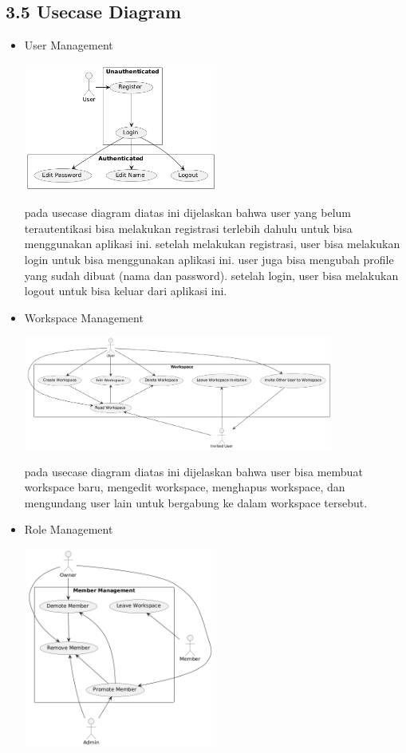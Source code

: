 \subsection*{3.5 Usecase Diagram}
\begin{itemize}
  \item User Management
  \begin{center}
    \includegraphics[width=0.5\textwidth]{assets/usecase_diagrams/auth.png}
  \end{center}
  pada usecase diagram diatas ini dijelaskan bahwa user yang belum terautentikasi bisa melakukan registrasi terlebih dahulu untuk bisa menggunakan aplikasi ini.
  setelah melakukan registrasi, user bisa melakukan login untuk bisa menggunakan aplikasi ini. user juga bisa mengubah profile yang sudah dibuat (nama dan password).
  setelah login, user bisa melakukan logout untuk bisa keluar dari aplikasi ini.
  \item Workspace Management
  \begin{center}
    \includegraphics[width=0.8\textwidth]{assets/usecase_diagrams/workspace.png}
  \end{center}
  pada usecase diagram diatas ini dijelaskan bahwa user bisa membuat workspace baru, mengedit workspace, menghapus workspace, dan mengundang user lain untuk bergabung ke dalam workspace tersebut.
  \item Role Management
  \begin{center}
    \includegraphics[width=0.5\textwidth]{assets/usecase_diagrams/role.png}

\end{center}
\end{itemize}
